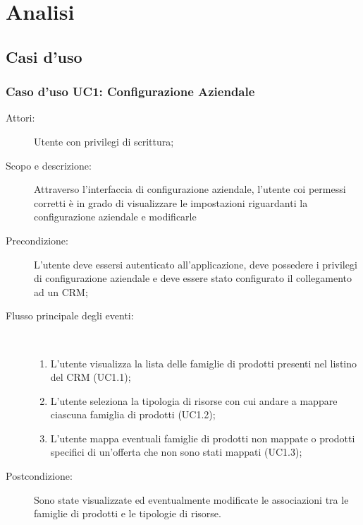 \documentclass[12pt,a4paper,twoside,openright,english]{book}
\begin{document}
\chapter{Analisi}\label{analisi}

\section{Casi d'uso}\label{usecase}

\hypertarget{UC1}{}
\subsection{Caso d'uso UC1: Configurazione Aziendale}\begin{description}
	\item[Attori:] Utente con privilegi di scrittura;
	\item[Scopo e descrizione:] Attraverso l’interfaccia di configurazione aziendale, l’utente coi permessi corretti è in grado di visualizzare le impostazioni riguardanti la configurazione aziendale e modificarle
	\item[Precondizione:] L’utente deve essersi autenticato all’applicazione, deve possedere i privilegi di configurazione aziendale e deve essere stato configurato il collegamento ad un CRM;
	
	\item[Flusso principale degli eventi:] \ 
	\begin{enumerate}
		\item L’utente visualizza la lista delle famiglie di prodotti presenti nel listino del CRM  (UC1.1);
		\item L’utente seleziona la tipologia di risorse con cui andare a mappare ciascuna famiglia di prodotti  (UC1.2);
		\item L’utente mappa eventuali famiglie di prodotti non mappate o prodotti specifici di un’offerta che non sono stati mappati  (UC1.3);
		
	\end{enumerate}
	\item[Postcondizione:] Sono state visualizzate ed eventualmente modificate le associazioni tra le famiglie di prodotti e le tipologie di risorse.
\end{description}


\hypertarget{UC2}{}
\end{document}
